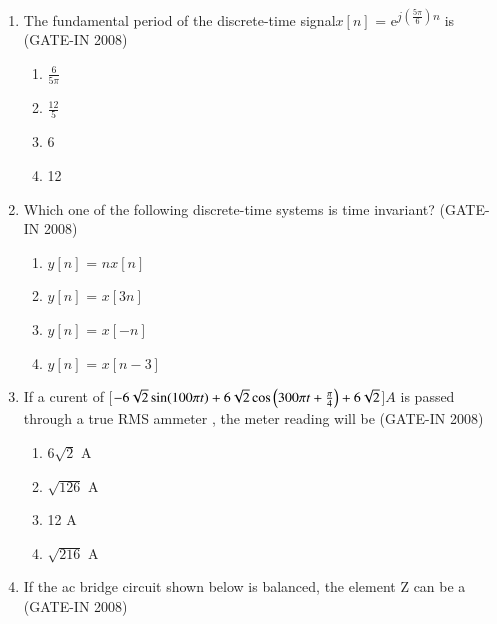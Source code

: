 \documentclass[journal,12pt,onecolumn]{IEEEtran}
\theoremstyle{remark}
\begin{document}
\begin{enumerate}
    \item  The fundamental period of the discrete-time signal$x[n]$ = e\textsuperscript{$j(\frac{5\pi}{6})n$} is  \hfill (GATE-IN 2008)
    \begin{multicols}{4}
    \begin{enumerate} 
        \item $\frac{6}{5\pi}$
        \item $\frac{12}{5}$
        \item 6
        \item 12
    \end{enumerate}
    \end{multicols}
    
    \item  Which one of the following discrete-time systems is time invariant? \hfill (GATE-IN 2008)
    \begin{multicols}{4}
    \begin{enumerate} 
        \item $y[n]$ = $nx[n]$
        \item $y[n]$ = $x[3n]$
        \item $y[n]$ = $x[-n]$
        \item $y[n]$ = $x[n-3]$
    \end{enumerate}
    \end{multicols}
    
    \item If a curent of [$-6\sqrt{2}\sin(100{\pi}t) +6\sqrt{2}\cos\left(300{\pi}t + \frac{\pi}{4}\right) + 6\sqrt{2}$]$A$ is passed through a true RMS ammeter , the meter reading will be \hfill (GATE-IN 2008) 
    \begin{multicols}{4}
    \begin{enumerate} 
        \item $6\sqrt{2}$ A
        \item $\sqrt{126}$ A
        \item 12 A
        \item $\sqrt{216}$ A
    \end{enumerate}
    \end{multicols}
    
    \item If the ac bridge circuit shown below is balanced, the element Z can be a  \hfill (GATE-IN 2008)


\end{enumerate}
\end{document}
